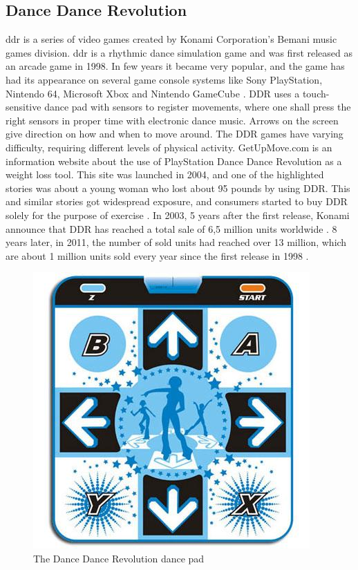 \subsection{Dance Dance Revolution}
\ac{ddr} is a series of video games created by Konami Corporation’s Bemani music games division. \ac{ddr} is a rhythmic dance simulation game and was first released as an arcade game in 1998. In few years it became very popular, and the game has had its appearance on several game console systems like Sony PlayStation, Nintendo 64, Microsoft Xbox and Nintendo GameCube \cite{bogost2005rhetoric}. DDR uses a touch-sensitive dance pad with sensors to register movements, where one shall press the right sensors in proper time with electronic dance music. Arrows on the screen give direction on how and when to move around. The DDR games have varying difficulty, requiring different levels of physical activity. GetUpMove.com is an information website about the use of PlayStation Dance Dance Revolution as a weight loss tool. This site was launched in 2004, and one of the highlighted stories was about a young woman who lost about 95 pounds by using DDR. This and similar stories got widespread exposure, and consumers started to buy DDR solely for the purpose of exercise \cite{bogost2005rhetoric}. In 2003, 5 years after the first release, Konami announce that DDR has reached a total sale of 6,5 million units worldwide \cite{gamespot}. 8 years later, in 2011, the number of sold units had reached over 13 million, which are about 1 million units sold every year since the first release in 1998 \cite{gaygamer}. 
\begin{figure}[h!]
\begin{center}
\includegraphics[scale=0.5]{ddrpad}
\caption[Dance Dance Revolution]{The Dance Dance Revolution dance pad}
\label{fig:DDRPad}
\end{center}
\end{figure}


